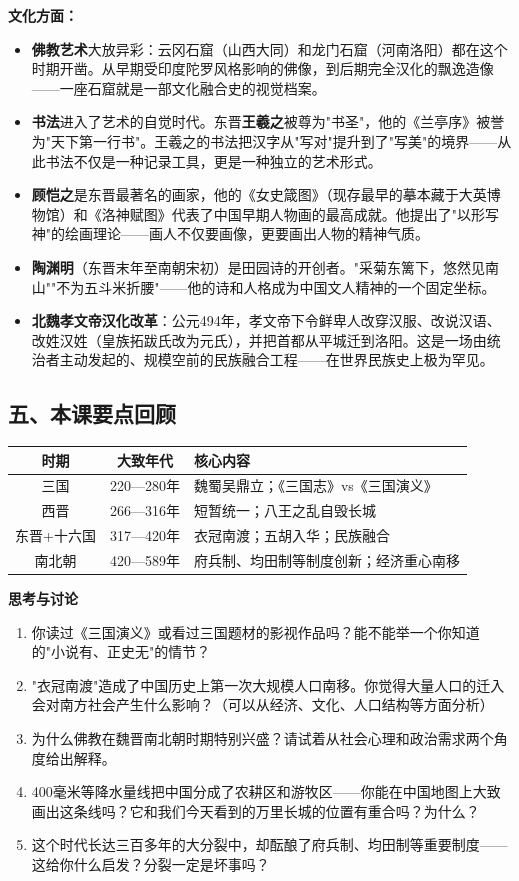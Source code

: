 \documentclass[a4paper,12pt]{ctexart}
\begin{document}
\textbf{文化方面：}
\begin{itemize}
  \item \textbf{佛教艺术}大放异彩：云冈石窟（山西大同）和龙门石窟（河南洛阳）都在这个时期开凿。从早期受印度陀罗风格影响的佛像，到后期完全汉化的飘逸造像——一座石窟就是一部文化融合史的视觉档案。
  \item \textbf{书法}进入了艺术的自觉时代。东晋\textbf{王羲之}被尊为"书圣"，他的《兰亭序》被誉为"天下第一行书"。王羲之的书法把汉字从"写对"提升到了"写美"的境界——从此书法不仅是一种记录工具，更是一种独立的艺术形式。
  \item \textbf{顾恺之}是东晋最著名的画家，他的《女史箴图》（现存最早的摹本藏于大英博物馆）和《洛神赋图》代表了中国早期人物画的最高成就。他提出了"以形写神"的绘画理论——画人不仅要画像，更要画出人物的精神气质。
  \item \textbf{陶渊明}（东晋末年至南朝宋初）是田园诗的开创者。"采菊东篱下，悠然见南山""不为五斗米折腰"——他的诗和人格成为中国文人精神的一个固定坐标。
  \item \textbf{北魏孝文帝汉化改革}：公元494年，孝文帝下令鲜卑人改穿汉服、改说汉语、改姓汉姓（皇族拓跋氏改为元氏），并把首都从平城迁到洛阳。这是一场由统治者主动发起的、规模空前的民族融合工程——在世界民族史上极为罕见。
\end{itemize}

\subsection*{五、本课要点回顾}

\begin{center}
\begin{tabular}{|c|c|p{8cm}|}
\hline
\textbf{时期} & \textbf{大致年代} & \textbf{核心内容} \\
\hline
三国 & 220—280年 & 魏蜀吴鼎立；《三国志》vs《三国演义》 \\
\hline
西晋 & 266—316年 & 短暂统一；八王之乱自毁长城 \\
\hline
东晋+十六国 & 317—420年 & 衣冠南渡；五胡入华；民族融合 \\
\hline
南北朝 & 420—589年 & 府兵制、均田制等制度创新；经济重心南移 \\
\hline
\end{tabular}
\end{center}

{\large\textcolor{orange!80!black}{\textbf{思考与讨论}}}
\begin{enumerate}
  \item 你读过《三国演义》或看过三国题材的影视作品吗？能不能举一个你知道的"小说有、正史无"的情节？
  \item "衣冠南渡"造成了中国历史上第一次大规模人口南移。你觉得大量人口的迁入会对南方社会产生什么影响？（可以从经济、文化、人口结构等方面分析）
  \item 为什么佛教在魏晋南北朝时期特别兴盛？请试着从社会心理和政治需求两个角度给出解释。
  \item 400毫米等降水量线把中国分成了农耕区和游牧区——你能在中国地图上大致画出这条线吗？它和我们今天看到的万里长城的位置有重合吗？为什么？
  \item 这个时代长达三百多年的大分裂中，却酝酿了府兵制、均田制等重要制度——这给你什么启发？分裂一定是坏事吗？
\end{enumerate}
\end{document}
